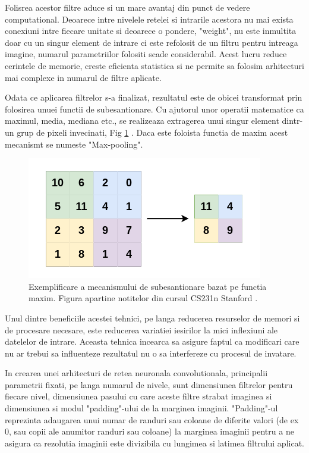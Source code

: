 \documentclass[a4paper,12pt]{book}
\begin{document}
				Folisrea acestor filtre aduce si un mare avantaj din punct de vedere computational. Deoarece intre nivelele retelei si intrarile acestora nu mai exista conexiuni intre fiecare unitate si deoarece o pondere, "weight", nu este inmultita doar cu un singur element de intrare ci este refolosit de un filtru pentru intreaga imagine, numarul parametriilor folositi scade considerabil. Acest lucru reduce cerintele de memorie, creste eficienta statistica si ne permite sa folosim arhitecturi mai complexe in numarul de filtre aplicate. \par
				
				Odata ce aplicarea filtrelor s-a finalizat, rezultatul este de obicei transformat prin folosirea unuei functii de subesantionare. Cu ajutorul unor operatii matematice ca maximul, media, mediana etc., se realizeaza extragerea unui singur element dintr-un grup de pixeli invecinati, Fig \ref{fig:maxpool} . Daca este foloista functia de maxim acest mecanismt se numeste "Max-pooling".
								
				\begin{figure}[h]
					\centering
					\includegraphics[scale=0.25]{maxpool}
					\caption{Exemplificare a mecanismului de subesantionare bazat pe functia maxim. Figura apartine notitelor din cursul CS231n Stanford \cite{standord_cnn}.}
					\label{fig:maxpool}
				\end{figure}
				
				 \noindent Unul dintre beneficiile acestei tehnici, pe langa reducerea resurselor de memori si de procesare necesare, este reducerea variatiei iesirilor la mici inflexiuni ale datelelor de intrare. Aceasta tehnica incearca sa asigure faptul ca modificari care nu ar trebui sa influenteze rezultatul nu o sa interfereze cu procesul de invatare. \par
				
				In crearea unei arhitecturi de retea neuronala convolutionala, principalii parametrii fixati, pe langa numarul de nivele, sunt dimensiunea filtrelor pentru fiecare nivel, dimensiunea pasului cu care aceste filtre strabat imaginea si dimensiunea si modul "padding"-ului de la marginea imaginii. "Padding"-ul reprezinta adaugarea unui numar de randuri sau coloane de diferite valori (de ex 0, sau copii ale anumitor randuri sau coloane) la marginea imaginii pentru a ne asigura ca rezolutia imaginii este divizibila cu lungimea si latimea filtrului aplicat.
				
\end{document}
